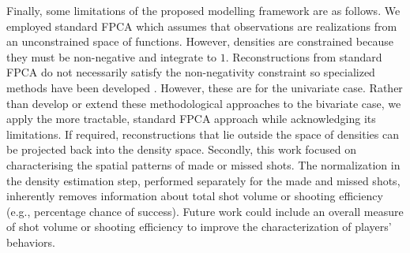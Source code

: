 Finally, some limitations of the proposed modelling framework are as follows.
	We employed standard FPCA which assumes that observations are realizations from an unconstrained space of functions.
		However, densities are constrained because they must be non-negative and integrate to $1$. Reconstructions from standard FPCA do not necessarily satisfy the non-negativity constraint so specialized methods have been developed \citep{petersenFunctionalDataAnalysis2016}. However, these are for the univariate case. Rather than develop or extend these methodological approaches to the bivariate case, we apply the more tractable, standard FPCA approach while acknowledging its limitations. If required, reconstructions that lie outside the space of densities can be projected back into the density space.
	Secondly, this work focused on characterising the spatial patterns of made or missed shots. The normalization in the density estimation step, performed separately for the made and missed shots, inherently removes information about total shot volume or shooting efficiency (e.g., percentage chance of success). Future work could include an overall measure of shot volume or shooting efficiency to improve the characterization of players' behaviors.


